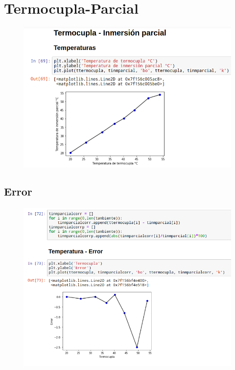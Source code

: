 \documentclass[a4paper,11pt]{report}
\begin{document}
\section{Termocupla-Parcial}
\begin{figure}[H]
\includegraphics[scale=0.52]{pparcial1.png}
\end{figure}
\subsection{Error}
\begin{figure}[H]
\includegraphics[scale=0.62]{pparcial2.png}
\end{figure}
\end{document}

